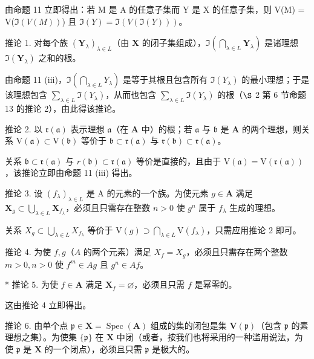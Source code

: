 由命题 11 立即得出：若 M 是 A 的任意子集而 Y 是 X 的任意子集，则 V(M) = V(\(\Im(V(M))\)) 且 \(\Im(Y) = \Im(V(\Im(Y)))\)。

推论 1. 对每个族 \((\mathbf{Y}_{\lambda})_{\lambda \in L}\)（由 \(\mathbf{X}\) 的闭子集组成），\(\Im\left(\bigcap_{\lambda \in L} \mathbf{Y}_{\lambda}\right)\) 是诸理想 \(\Im(\mathbf{Y}_{\lambda})\) 之和的根。

由命题 11 (iii)，\(\Im\left(\bigcap_{\lambda\in L}Y_{\lambda}\right)\) 是等于其根且包含所有 \(\Im(Y_{\lambda})\) 的最小理想；于是该理想包含 \(\sum_{\lambda\in L}\Im(Y_{\lambda})\)，从而也包含 \(\sum_{\lambda\in L}\Im(Y_{\lambda})\) 的根（\(\S\) 2 第 6 节命题 13 的推论 2），由此得该推论。

推论 2. 以 \(\mathfrak{r}(\mathfrak{a})\) 表示理想 \(\mathfrak{a}\)（在 \(\mathbf{A}\) 中）的根；若 \(\mathfrak{a}\) 与 \(\mathfrak{b}\) 是 \(\mathbf{A}\) 的两个理想，则关系 \(\mathrm{V}(\mathfrak{a}) \subset \mathrm{V}(\mathfrak{b})\) 等价于 \(\mathfrak{b} \subset \mathfrak{r}(\mathfrak{a})\) 与 \(\mathfrak{r}(\mathfrak{b}) \subset \mathfrak{r}(\mathfrak{a})\)。

关系 \(\mathfrak{b} \subset \mathfrak{r}(\mathfrak{a})\) 与 \(r(\mathfrak{b}) \subset \mathfrak{r}(\mathfrak{a})\) 等价是直接的，且由于 \(\mathrm{V}(\mathfrak{a}) = \mathrm{V}(\mathfrak{r}(\mathfrak{a}))\)，该推论立即由命题 11 (iii) 得出。

推论 3. 设 \((f_{\lambda})_{\lambda \in L}\) 是 A 的元素的一个族。为使元素 \(g \in \mathbf{A}\) 满足 \(\mathbf{X}_g \subset \bigcup_{\lambda \in L} \mathbf{X}_{f_\lambda}\)，必须且只需存在整数 \(n > 0\) 使 \(g^n\) 属于 \(f_\lambda\) 生成的理想。

关系 \(X_{g} \subset \bigcup_{\lambda \in L} X_{f_{\lambda}}\) 等价于 \(\mathrm{V}(g) \supset \bigcap_{\lambda \in L} \mathrm{V}(f_{\lambda})\)，只需应用推论 2 即可。

推论 4. 为使 \(f, g\)（\(A\) 的两个元素）满足 \(X_f = X_g\)，必须且只需存在两个整数 \(m > 0, n > 0\) 使 \(f^m \in Ag\) 且 \(g^n \in Af\)。

* 推论 5. 为使 \(f \in \mathbf{A}\) 满足 \(\mathbf{X}_f = \varnothing\)，必须且只需 \(f\) 是幂零的。

这由推论 4 立即得出。

推论 6. 由单个点 \(\mathfrak{p} \in \mathbf{X} = \operatorname{Spec}(\mathbf{A})\) 组成的集的闭包是集 \(\mathbf{V}(\mathfrak{p})\)（包含 \(\mathfrak{p}\) 的素理想之集）。为使集 \(\{\mathfrak{p}\}\) 在 \(\mathbf{X}\) 中闭（或者，按我们也将采用的一种滥用说法，为使 \(\mathfrak{p}\) 是 \(\mathbf{X}\) 的一个闭点），必须且只需 \(\mathfrak{p}\) 是极大的。

